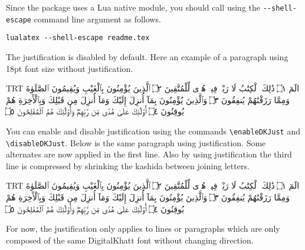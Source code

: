 \documentclass{article}
\newcommand{\DigitalKhatt}{DigitalKhatt}
\begin{document}
Since the package uses a Lua native module, you should call \LuaLaTeX{} using the \verb!--shell-escape! command line argument as follows.
\begin{verbatim}
lualatex --shell-escape readme.tex
\end{verbatim}
The justification is disabled by default. Here an example of a paragraph using 18pt font size without justification.\par
{\digitalkhatt{18pt}\selectfont\pardir TRT
الٓمٓ ۝١ ذَٰلِكَ ٱلْكِتَٰبُ لَا رَيْبَۛ فِيهِۛ هُدࣰى
لِّلْمُتَّقِينَ ۝٢ ٱلَّذِينَ يُؤْمِنُونَ بِٱلْغَيْبِ وَيُقِيمُونَ ٱلصَّلَوٰةَ
وَمِمَّا رَزَقْنَٰهُمْ يُنفِقُونَ ۝٣ وَٱلَّذِينَ يُؤْمِنُونَ بِمَآ أُنزِلَ
إِلَيْكَ وَمَآ أُنزِلَ مِن قَبْلِكَ وَبِٱلْأٓخِرَةِ هُمْ يُوقِنُونَ ۝٤
أُو۟لَٰٓئِكَ عَلَىٰ هُدࣰى مِّن رَّبِّهِمْۖ وَأُو۟لَٰٓئِكَ
هُمُ ٱلْمُفْلِحُونَ ۝٥
\par}
You can enable and disable justification using the commands \verb!\enableDKJust! and \verb!\disableDKJust!. Below is the same paragraph using justification.
Some alternates are now applied in the first line. Also by using justification the third line is compressed by shrinking the kashida between joining letters.\par
{\digitalkhatt{18pt}\enableDKJust\pardir TRT
الٓمٓ ۝١ ذَٰلِكَ ٱلْكِتَٰبُ لَا رَيْبَۛ فِيهِۛ هُدࣰى
لِّلْمُتَّقِينَ ۝٢ ٱلَّذِينَ يُؤْمِنُونَ بِٱلْغَيْبِ وَيُقِيمُونَ ٱلصَّلَوٰةَ
وَمِمَّا رَزَقْنَٰهُمْ يُنفِقُونَ ۝٣ وَٱلَّذِينَ يُؤْمِنُونَ بِمَآ أُنزِلَ
إِلَيْكَ وَمَآ أُنزِلَ مِن قَبْلِكَ وَبِٱلْأٓخِرَةِ هُمْ يُوقِنُونَ ۝٤
أُو۟لَٰٓئِكَ عَلَىٰ هُدࣰى مِّن رَّبِّهِمْۖ وَأُو۟لَٰٓئِكَ
هُمُ ٱلْمُفْلِحُونَ ۝٥
\par}

For now, the justification only applies to lines or paragraphs which are only composed of the same \DigitalKhatt{} font without changing direction.
\end{document}
